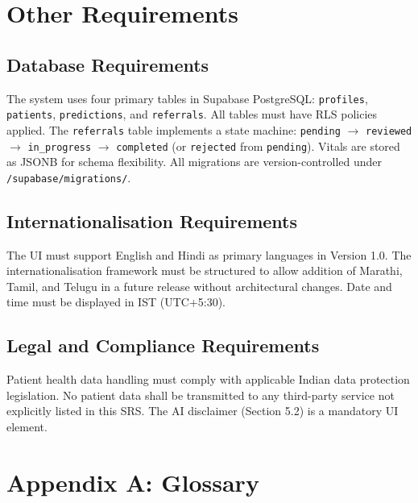 \documentclass[12pt,a4paper]{article}
\begin{document}
\section{Other Requirements}

\subsection{Database Requirements}
The system uses four primary tables in Supabase PostgreSQL: \texttt{profiles}, \texttt{patients}, \texttt{predictions}, and \texttt{referrals}. All tables must have RLS policies applied. The \texttt{referrals} table implements a state machine: \texttt{pending} $\rightarrow$ \texttt{reviewed} $\rightarrow$ \texttt{in\_progress} $\rightarrow$ \texttt{completed} (or \texttt{rejected} from \texttt{pending}). Vitals are stored as JSONB for schema flexibility. All migrations are version-controlled under \texttt{/supabase/migrations/}.

\subsection{Internationalisation Requirements}
The UI must support English and Hindi as primary languages in Version 1.0. The internationalisation framework must be structured to allow addition of Marathi, Tamil, and Telugu in a future release without architectural changes. Date and time must be displayed in IST (UTC+5:30).

\subsection{Legal and Compliance Requirements}
Patient health data handling must comply with applicable Indian data protection legislation. No patient data shall be transmitted to any third-party service not explicitly listed in this SRS. The AI disclaimer (Section 5.2) is a mandatory UI element.

\newpage
\section*{Appendix A: Glossary}
\end{document}
